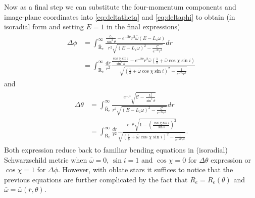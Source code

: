 \documentclass[iop, usenatbib]{emulateapj}
\newcommand{\rb}{\ensuremath{\bar{r}}}
\newcommand{\wb}{\ensuremath{\bar{\omega}}}
\newcommand{\nub}{\ensuremath{\bar{\nu}}}
\begin{document}
Now as a final step we can substitute the four-momentum components and image-plane coordinates into \eqref{eq:deltatheta} and \eqref{eq:deltaphi} to obtain (in isoradial form and setting $E=1$ in the final expressions)
\begin{align}\begin{split}
 \Delta \phi &= 
 \int_{\mathrm{\bar{R}_e}}^{\infty} \frac{ \frac{L_z}{\sin^2\theta} - e^{-2\nub}r^2\wb(E-L_z \omega)}{r^2 \sqrt{(E-L_z\omega)^2-\frac{\mathcal{C}}{e^{-2\nub}r^2}}} dr \\
 &= \int_{\mathrm{\bar{R}_e}}^{\infty} \frac{dr}{r^2} \frac{\frac{\cos\chi \sin i}{\sin^2\theta} - e^{-2\nub}r^2\wb \left(\frac{1}{b} + \wb \cos\chi \sin i \right)}{\sqrt{\left(\frac{1}{b} + \wb \cos\chi \sin i \right)^2 - \frac{1}{e^{-2\nub} r^2}}}
\end{split}\end{align}
and
\begin{align}\begin{split}
    \Delta \theta &=
    \int_{\mathrm{\bar{R}_e}}^{\infty} \frac{e^{-\mu}\sqrt{\mathcal{C} - \frac{L_z^2}{\sin^2\theta}}}{r^2\sqrt{(E-L_z\omega)^2-\frac{\mathcal{C}}{e^{-2\nub}r^2}}} dr \\
    &= \int_{\mathrm{\bar{R}_e}}^{\infty} \frac{dr}{r^2} \frac{e^{-\mu} \sqrt{1-\left(\frac{\cos\chi \sin i}{\sin\theta}\right)^2}}{\sqrt{\left(\frac{1}{b} + \wb \cos\chi \sin i \right)^2 - \frac{1}{e^{-2\nub} r^2}}}.
\end{split}\end{align}
Both expression reduce back to familiar bending equations in (isoradial) Schwarzschild metric when $\wb=0$, $\sin i = 1$ and $\cos\chi = 0$ for $\Delta\theta$ expression or $\cos\chi = 1$ for $\Delta\phi$.
However, with oblate stars it suffices to notice that the previous equations are further complicated by the fact that $\bar{R}_e = \bar{R}_e(\theta)$ and $\wb = \wb(\rb, \theta)$.
\end{document}
